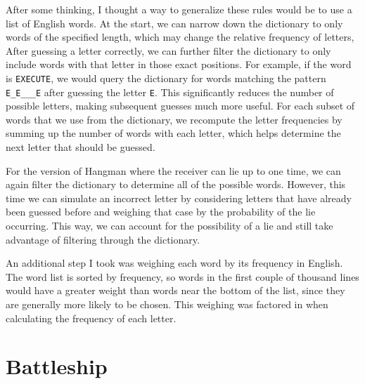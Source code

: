\documentclass{article}
\begin{document}
After some thinking, I thought a way to generalize these rules would be to use a list of English words. At the start, we can narrow down the dictionary to only words of the specified length, which may change the relative frequency of letters, After guessing a letter correctly, we can further filter the dictionary to only include words with that letter in those exact positions. For example, if the word is \texttt{EXECUTE}, we would query the dictionary for words matching the pattern \texttt{E\_E\_\_\_E} after guessing the letter \texttt{E}. This significantly reduces the number of possible letters, making subsequent guesses much more useful. For each subset of words that we use from the dictionary, we recompute the letter frequencies by summing up the number of words with each letter, which helps determine the next letter that should be guessed.

For the version of Hangman where the receiver can lie up to one time, we can again filter the dictionary to determine all of the possible words. However, this time we can simulate an incorrect letter by considering letters that have already been guessed before and weighing that case by the probability of the lie occurring. This way, we can account for the possibility of a lie and still take advantage of filtering through the dictionary.

An additional step I took was weighing each word by its frequency in English. The word list is sorted by frequency, so words in the first couple of thousand lines would have a greater weight than words near the bottom of the list, since they are generally more likely to be chosen. This weighing was factored in when calculating the frequency of each letter.

\section*{Battleship}

\iffalse
\begin{thebibliography}{9}
\end{thebibliography}
\fi
\end{document}
